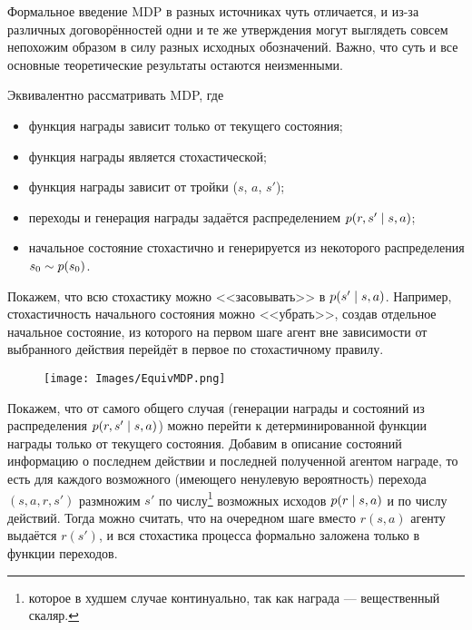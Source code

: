 Формальное введение MDP в разных источниках чуть отличается, и из-за различных договорённостей одни и те же утверждения могут выглядеть совсем непохожим образом в силу разных исходных обозначений. Важно, что суть и все основные теоретические результаты остаются неизменными.

\begin{theorem}
Эквивалентно рассматривать MDP, где
\begin{itemize}
    \item функция награды зависит только от текущего состояния;
    \item функция награды является стохастической;
    \item функция награды зависит от тройки ($s$, $a$, $s'$);
    \item переходы и генерация награды задаётся распределением $p(r, s' \HM\mid s, a)$;
    \item начальное состояние стохастично и генерируется из некоторого распределения $s_0 \HM\sim p(s_0)$.
\end{itemize}

Покажем, что всю стохастику можно <<засовывать>>  в $p(s' \HM\mid s, a)$. Например, стохастичность начального состояния можно <<убрать>>, создав отдельное начальное состояние, из которого на первом шаге агент вне зависимости от выбранного действия перейдёт в первое по стохастичному правилу.

\begin{wrapfigure}[9]{r}{0.35\textwidth}
\vspace{-0.5cm}
\centering
\texttt{[image: Images/EquivMDP.png]}
\vspace{-0.9cm}
\end{wrapfigure}

Покажем, что от самого общего случая (генерации награды и состояний из распределения $p(r, s' \HM\mid s, a)$) можно перейти к детерминированной функции награды только от текущего состояния. Добавим в описание состояний информацию о последнем действии и последней полученной агентом награде, то есть для каждого возможного (имеющего ненулевую вероятность) перехода $(s, a, r, s')$ размножим $s'$ по числу\footnote[*]{которое в худшем случае континуально, так как награда --- вещественный скаляр.} возможных исходов $p(r \HM\mid s, a)$ и по числу действий. Тогда можно считать, что на очередном шаге вместо $r(s, a)$ агенту выдаётся $r(s')$, и вся стохастика процесса формально заложена только в функции переходов. \QED
\end{theorem}

